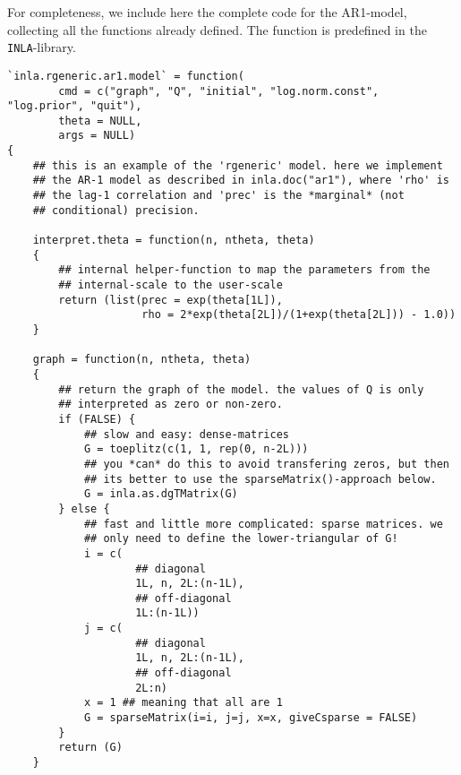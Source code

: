 \documentclass[a4paper,11pt]{article}
\begin{document}
For completeness, we include here the complete code for the AR1-model,
collecting all the functions already defined. The function is
predefined in the \texttt{INLA}-library.
\begin{verbatim}
`inla.rgeneric.ar1.model` = function(
        cmd = c("graph", "Q", "initial", "log.norm.const", "log.prior", "quit"),
        theta = NULL,
        args = NULL)
{
    ## this is an example of the 'rgeneric' model. here we implement
    ## the AR-1 model as described in inla.doc("ar1"), where 'rho' is
    ## the lag-1 correlation and 'prec' is the *marginal* (not
    ## conditional) precision.

    interpret.theta = function(n, ntheta, theta)
    {
        ## internal helper-function to map the parameters from the
        ## internal-scale to the user-scale
        return (list(prec = exp(theta[1L]),
                     rho = 2*exp(theta[2L])/(1+exp(theta[2L])) - 1.0))
    }

    graph = function(n, ntheta, theta)
    {
        ## return the graph of the model. the values of Q is only
        ## interpreted as zero or non-zero.
        if (FALSE) {
            ## slow and easy: dense-matrices
            G = toeplitz(c(1, 1, rep(0, n-2L)))
            ## you *can* do this to avoid transfering zeros, but then
            ## its better to use the sparseMatrix()-approach below.
            G = inla.as.dgTMatrix(G)
        } else {
            ## fast and little more complicated: sparse matrices. we
            ## only need to define the lower-triangular of G!
            i = c(
                    ## diagonal
                    1L, n, 2L:(n-1L),
                    ## off-diagonal
                    1L:(n-1L))
            j = c(
                    ## diagonal
                    1L, n, 2L:(n-1L),
                    ## off-diagonal
                    2L:n)
            x = 1 ## meaning that all are 1
            G = sparseMatrix(i=i, j=j, x=x, giveCsparse = FALSE)
        }            
        return (G)
    }


\end{verbatim}
\end{document}
